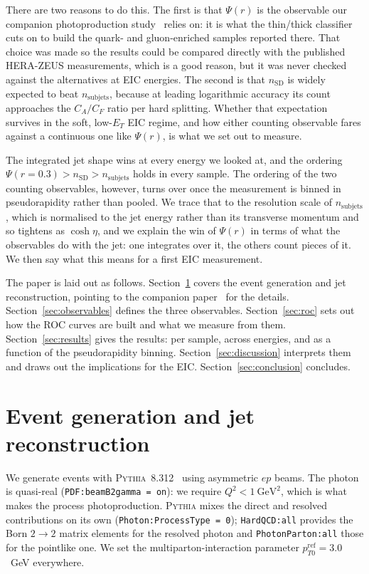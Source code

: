\documentclass[reprint,amsmath,amssymb,aps,prd,floatfix]{revtex4-2}
\begin{document}
There are two reasons to do this. The first is that $\Psi(r)$ is the observable
our companion photoproduction study~\cite{Singh:2026photo} relies on: it is
what the thin/thick
classifier cuts on to build the quark- and gluon-enriched samples reported
there. That choice was made so the results could be compared directly with the
published HERA-ZEUS measurements, which is a good reason, but it was never
checked against the alternatives at EIC energies. The second is that
$n_{\mathrm{SD}}$ is widely expected to beat $n_{\mathrm{subjets}}$, because at
leading logarithmic accuracy its count approaches the $C_A / C_F$ ratio per
hard splitting. Whether that expectation survives in the soft, low-$E_T$ EIC
regime, and how either counting observable fares against a continuous one like
$\Psi(r)$, is what we set out to measure.

The integrated jet shape wins at every energy we looked at, and the ordering
$\Psi(r=0.3) > n_{\mathrm{SD}} > n_{\mathrm{subjets}}$ holds in every sample.
The ordering of the two counting observables, however, turns over once the
measurement is binned in pseudorapidity rather than pooled. We trace that to
the resolution scale of $n_{\mathrm{subjets}}$, which is normalised to the jet
energy rather than its transverse momentum and so tightens as $\cosh\eta$,
and we explain the win of $\Psi(r)$ in terms of what the observables do with
the jet: one integrates over it, the others count pieces of it. We then say
what this means for a first EIC measurement.

The paper is laid out as follows. Section~\ref{sec:generation} covers the event
generation and jet reconstruction, pointing to the companion
paper~\cite{Singh:2026photo} for the
details. Section~\ref{sec:observables} defines the three observables.
Section~\ref{sec:roc} sets out how the ROC curves are built and what we
measure from them. Section~\ref{sec:results} gives the results: per sample,
across energies, and as a function of the pseudorapidity binning.
Section~\ref{sec:discussion} interprets them and draws out the implications for
the EIC. Section~\ref{sec:conclusion} concludes.

\section{Event generation and jet reconstruction}\label{sec:generation}

We generate events with \textsc{Pythia}~8.312~\cite{10.21468/SciPostPhysCodeb.8}
using asymmetric $ep$ beams. The photon is quasi-real
(\texttt{PDF:beamB2gamma = on}): we require $Q^2 < 1~\mathrm{GeV}^2$, which is
what makes the process photoproduction.
\textsc{Pythia} mixes the direct and resolved contributions on its own
(\texttt{Photon:ProcessType = 0}); \texttt{HardQCD:all} provides the Born
$2\to2$ matrix elements for the resolved photon and \texttt{PhotonParton:all}
those for the pointlike one. We set the multiparton-interaction parameter
$p_{T0}^{\mathrm{ref}} = 3.0$~GeV everywhere.
\end{document}
